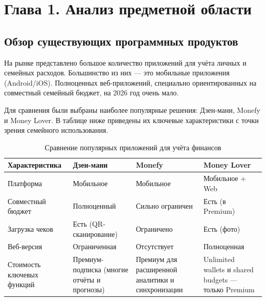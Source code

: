 \section*{Глава 1. Анализ предметной области}

\subsection{Обзор существующих программных продуктов}

На рынке представлено большое количество приложений для учёта личных и семейных расходов. Большинство из них — это мобильные приложения (Android/iOS). Полноценных веб-приложений, специально ориентированных на совместный семейный бюджет, на 2026 год очень мало.

Для сравнения были выбраны наиболее популярные решения: Дзен-мани\cite{zenmoney}, Monefy\cite{monefy} и Money Lover\cite{moneylover}. В таблице ниже приведены их ключевые характеристики с точки зрения семейного использования.

\begin{table}[h]
	\centering
	\caption{Сравнение популярных приложений для учёта финансов}
	\label{tab:competitors}
	
	{\fontsize{12}{14}\selectfont
	\setlength{\tabcolsep}{6pt}
	
	\begin{tabular}{|p{3.7cm}|p{3.7cm}|p{3.5cm}|p{3.5cm}|}
	\hline
	\textbf{Характеристика} 
		& \textbf{Дзен-мани} 
		& \textbf{Monefy} 
		& \textbf{Money Lover} \\
	\hline
	
	Платформа 
		& Мобильное 
		& Мобильное 
		& Мобильное + Web \\
	\hline
	
	Совместный бюджет 
		& Полноценный 
		& Сильно ограничен 
		& Есть (в Premium) \\
	\hline
	
	Загрузка чеков 
		& Есть (QR-сканирование) 
		& Ограничено 
		& Есть (фото) \\
	\hline
	
	Веб-версия 
		& Ограниченная 
		& Отсутствует 
		& Полноценная \\
	\hline
	
	Стоимость ключевых функций 
		& Премиум-подписка (многие отчёты и прогнозы) 
		& Премиум для расширенной аналитики и синхронизации 
		& Unlimited wallets и shared budgets — только Premium \\
	\hline
	\end{tabular}
	
	}
	\end{table}


